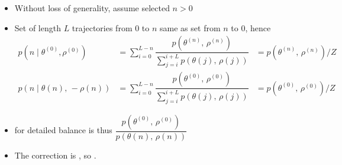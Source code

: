 \documentclass[10pt]{report}
\newcommand{\pos}[2]{#1^{(#2)}}
\begin{document}
\begin{itemize}
\item Without loss of generality, assume selected $n > 0$
\item Set of length $L$ trajectories from 0 to $n$ same
  as set from $n$ to 0, hence
\begin{align*}
  p(n \mid \pos{\theta}{0}, \pos{\rho}{0})
  &= \sum_{i=0}^{L-n}
      \dfrac{p(\pos{\theta}{n},\, \pos{\rho}{n})}
            {\sum_{j=i}^{i + L} p(\theta(j),\, \rho(j))}
  &= p(\pos{\theta}{n},\, \pos{\rho}{n}) / Z
  \\[4pt]
  p(n \mid \theta(n),\, -\rho(n))
  &= \sum_{i=0}^{L-n} \dfrac{p(\pos{\theta}{0},\, \pos{\rho}{0})}
                           {\sum_{j=i}^{i + L} p(\theta(j),\, \rho(j))}
  & = p(\pos{\theta}{0},\, \pos{\rho}{0}) / Z
\end{align*}
\item {} for detailed balance is thus
$\dfrac{p(\pos{\theta}{0},\, \pos{\rho}{0})}
      {p(\theta(n),\, \rho(n))}$
\item The correction is , so .
\end{itemize}




\end{document}
